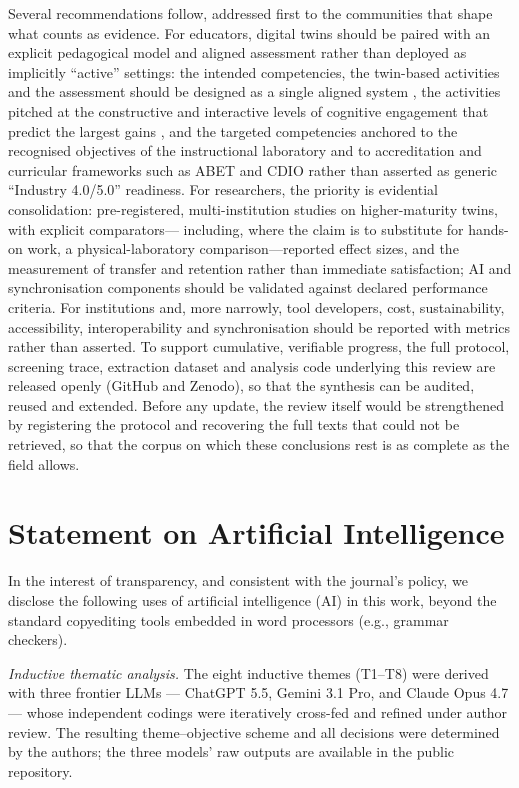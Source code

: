 Several recommendations follow, addressed first to the communities that shape what
counts as evidence. For educators, digital twins should be paired with an explicit
pedagogical model and aligned assessment rather than deployed as implicitly
``active'' settings: the intended competencies, the twin-based activities and the
assessment should be designed as a single aligned system \citep{biggs_teaching_2011},
the activities pitched at the constructive and interactive levels of cognitive
engagement that predict the largest gains \citep{chi_icap_2014}, and the targeted
competencies anchored to the recognised objectives of the instructional
laboratory \citep{feisel_role_2005} and to accreditation and curricular frameworks such
as ABET and CDIO rather than asserted as generic ``Industry 4.0/5.0'' readiness. For
researchers, the priority is evidential consolidation: pre-registered,
multi-institution studies on higher-maturity twins, with explicit comparators---
including, where the claim is to substitute for hands-on work, a physical-laboratory
comparison---reported effect sizes, and the measurement of transfer and retention
rather than immediate satisfaction; AI and synchronisation components should be
validated against declared performance criteria. For institutions and, more
narrowly, tool developers, cost, sustainability, accessibility, interoperability
and synchronisation should be reported with metrics rather than asserted. To
support cumulative, verifiable progress, the full protocol, screening trace,
extraction dataset and analysis code underlying this review are released openly
(GitHub and Zenodo), so that the synthesis can be audited, reused and extended.
Before any update, the review itself would be strengthened by registering the
protocol and recovering the full texts that could not be retrieved, so that the
corpus on which these conclusions rest is as complete as the field allows.

\section{Statement on Artificial Intelligence}\label{statement-on-artificial-intelligence}

In the interest of transparency, and consistent with the journal's policy, we
disclose the following uses of artificial intelligence (AI) in this work, beyond
the standard copyediting tools embedded in word processors (e.g., grammar
checkers).

\emph{Inductive thematic analysis.} The eight inductive themes (T1--T8) were derived
with three frontier LLMs --- ChatGPT 5.5, Gemini 3.1 Pro, and Claude Opus 4.7 ---
whose independent codings were iteratively cross-fed and refined under author
review. The resulting theme--objective scheme and all decisions were determined by
the authors; the three models' raw outputs are available in the public repository.

